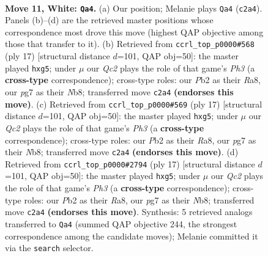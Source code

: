 \documentclass[11pt]{article}
\begin{document}
\clearpage

\begin{figure}[p]\centering
\begin{subfigure}{0.46\textwidth}\centering
\resizebox{\linewidth}{!}{%
\newchessgame
\chessboard[
  setfen={r1bqk3/pp1n1pp1/2n1p2r/3pP3/1b1P4/5P2/PPQN2PP/R1B1K1NR w KQq - 3 11},
  showmover=false,
  pgfstyle=straightmove, color=movearrow, markmove={c2-a4}
]}
\caption{}
\end{subfigure}\hfill
\begin{subfigure}{0.46\textwidth}\centering
\resizebox{\linewidth}{!}{%
\newchessgame
\chessboard[
  setfen={rnbqkb1r/p4p2/2p1pn1p/1p2P1N1/2pP3B/2N5/PP3PPP/R2QKB1R b KQkq - 0 9},
  showmover=false,
  pgfstyle=straightmove, color=movearrow, markmove={h6-g5}
]}
\caption{}
\end{subfigure}
\\[4pt]
\begin{subfigure}{0.46\textwidth}\centering
\resizebox{\linewidth}{!}{%
\newchessgame
\chessboard[
  setfen={rnbqkb1r/p4p2/2p1pn1p/1p2P1N1/2pP3B/2N5/PP3PPP/R2QKB1R b KQkq - 0 9},
  showmover=false,
  pgfstyle=straightmove, color=movearrow, markmove={h6-g5}
]}
\caption{}
\end{subfigure}\hfill
\begin{subfigure}{0.46\textwidth}\centering
\resizebox{\linewidth}{!}{%
\newchessgame
\chessboard[
  setfen={rnbqkb1r/p4p2/2p1pn1p/1p2P1N1/2pP3B/2N5/PP3PPP/R2QKB1R b KQkq - 0 9},
  showmover=false,
  pgfstyle=straightmove, color=movearrow, markmove={h6-g5}
]}
\caption{}
\end{subfigure}
\caption{\textbf{Move 11, White: \texttt{Qa4}.} (a) Our position; Melanie plays \texttt{Qa4} (\texttt{c2a4}). Panels (b)--(d) are the retrieved master positions whose correspondence most drove this move (highest QAP objective among those that transfer to it). (b) Retrieved from \texttt{ccrl\_top\_p0000\#568} (ply 17) [structural distance $d$=101, QAP obj=50]: the master played \texttt{hxg5}; under $\mu$ our \emph{Qc2} plays the role of that game's \emph{Ph3} (a \textbf{cross-type} correspondence); cross-type roles: our \emph{P}b2 as their \emph{R}a8, our \emph{p}g7 as their \emph{N}b8; transferred move \texttt{c2a4} \textbf{(endorses this move)}. (c) Retrieved from \texttt{ccrl\_top\_p0000\#569} (ply 17) [structural distance $d$=101, QAP obj=50]: the master played \texttt{hxg5}; under $\mu$ our \emph{Qc2} plays the role of that game's \emph{Ph3} (a \textbf{cross-type} correspondence); cross-type roles: our \emph{P}b2 as their \emph{R}a8, our \emph{p}g7 as their \emph{N}b8; transferred move \texttt{c2a4} \textbf{(endorses this move)}. (d) Retrieved from \texttt{ccrl\_top\_p0000\#2794} (ply 17) [structural distance $d$=101, QAP obj=50]: the master played \texttt{hxg5}; under $\mu$ our \emph{Qc2} plays the role of that game's \emph{Ph3} (a \textbf{cross-type} correspondence); cross-type roles: our \emph{P}b2 as their \emph{R}a8, our \emph{p}g7 as their \emph{N}b8; transferred move \texttt{c2a4} \textbf{(endorses this move)}. Synthesis: 5 retrieved analogs transferred to \texttt{Qa4} (summed QAP objective 244, the strongest correspondence among the candidate moves); Melanie committed it via the \texttt{search} selector.}

\end{figure}
\end{document}
